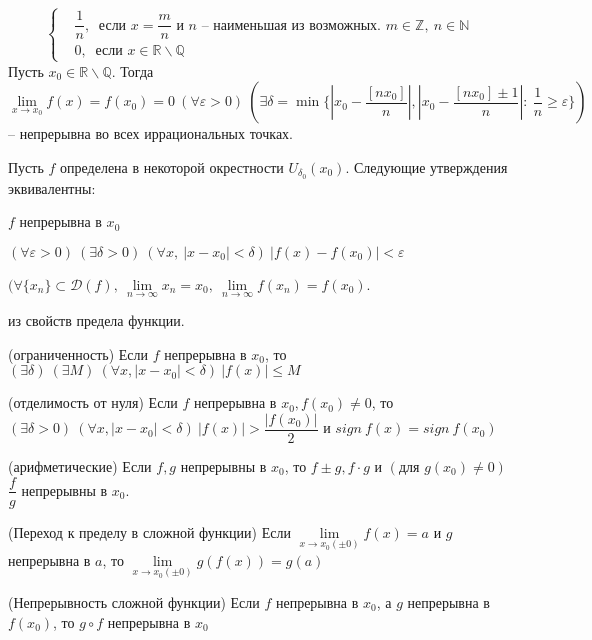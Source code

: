 \begin{multicols}{2}
\begin{enumerate*}
\[\begin{cases}
			&\dfrac{1}{n}, \ \text{ если $x = \dfrac{m}{n}$ и $n$ -- наименьшая из возможных. $m\in\mathbb Z,\ n\in\mathbb N$}\\&0,\ \text{ если $x \in\mathbb R \backslash \mathbb Q$}
		\end{cases}
	\]
Пусть $x_0 \in \mathbb R\backslash\mathbb Q.$ Тогда $\lim\limits_{x\to x_0} f(x) = f(x_0) = 0\ (\forall \varepsilon > 0)\ (\exists \delta = \min\{|x_0 - \dfrac{[nx_0]}{n}|, |x_0 - \dfrac{[nx_0] \pm 1}{n}|:\ \dfrac{1}{n} \geq \varepsilon\})$ -- непрерывна во всех иррациональных точках.
\end{enumerate*}
\begin{theorema}{}{}
Пусть $f$ определена в некоторой окрестности $U_{\delta_0}(x_0)$. Следующие утверждения эквивалентны: \begin{enumerate*}
		\item $f$ непрерывна в $x_0$
		\item $(\forall \varepsilon > 0)\ (\exists \delta > 0)\ (\forall x,\ |x-x_0| < \delta)\ |f(x) - f(x_0)| < \varepsilon$
		\item $(\forall \{x_n\}\subset \mathscr{D}(f),\ \lim\limits_{n\to\infty} x_n = x_0,\ \lim\limits_{n\to\infty} f(x_n) = f(x_0)$.
\end{enumerate*}
\end{theorema}
\cons из свойств предела функции.\begin{enumerate*}
		\item (ограниченность) Если $f$ непрерывна в $x_0$, то $(\exists \delta)\ (\exists M)\ (\forall x, |x- x_0 | < \delta)\ |f(x)|\leq M$
		\item (отделимость от нуля) Если $f$ непрерывна в $x_0, f(x_0) \neq 0$, то $(\exists \delta > 0)\ (\forall x, |x -x_0| < \delta )\ |f(x)| > \dfrac{|f(x_0)|}{2}$ и $sign\ f(x) = sign\ f(x_0)$
		\item (арифметические) Если $f,g$ непрерывны в $x_0$, то $f\pm g, f \cdot g$ и $(\text{для } g(x_0) \neq 0)$ $\dfrac{f}{g}$ непрерывны в $x_0$.
\end{enumerate*}
\begin{theorema}{(Переход к пределу в сложной функции)}{} Если $\lim\limits_{x\to x_0(\pm 0)} f(x) = a$ и $g$ непрерывна в $a$, то $\lim\limits_{x\to x_0(\pm 0)}g(f(x)) = g(a)$
\end{theorema}

\cons (Непрерывность сложной функции) Если $f$ непрерывна в $x_0$, а $g$ непрерывна в $f(x_0)$, то $g\circ f$ непрерывна в $x_0$


\end{multicols}
